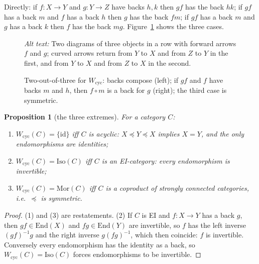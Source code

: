 \documentclass[11pt]{amsart}
\newtheorem{prop}[thm]{Proposition}
\theoremstyle{definition}
\newcommand{\Mor}{\mathrm{Mor}}
\newcommand{\Iso}{\mathrm{Iso}}
\newcommand{\End}{\mathrm{End}}
\newcommand{\Wcyc}{W_{\mathrm{cyc}}}
\begin{document}
Directly: if $f\colon X\to Y$ and $g\colon Y\to Z$ have backs $h,k$ then $gf$ has
the back $hk$; if $gf$ has a back $m$ and $f$ has a back $h$ then $g$ has the
back $fm$; if $gf$ has a back $m$ and $g$ has a back $k$ then $f$ has the
back $mg$. Figure~\ref{fig:cyc} shows the three cases.

\begin{figure}[ht]
\centering
{}
\qquad
{}
\caption{Two-out-of-three for $\Wcyc$: backs compose (left); if $gf$ and $f$
have backs $m$ and $h$, then $f\circ m$ is a back for $g$ (right); the third
case is symmetric.}
\label{fig:cyc}
\par\smallskip\noindent\textit{Alt text:} Two diagrams of three objects in a
row with forward arrows $f$ and $g$; curved arrows return from $Y$ to $X$ and
from $Z$ to $Y$ in the first, and from $Y$ to $X$ and from $Z$ to $X$ in the
second.
\end{figure}

\begin{prop}[the three extremes]\label{prop:extremes}
For a category $C$:
\begin{enumerate}
\item $\Wcyc(C)=\{\mathrm{id}\}$ iff $C$ is \emph{acyclic}: $X\preceq Y\preceq X$
implies $X=Y$, and the only endomorphisms are identities;
\item $\Wcyc(C)=\Iso(C)$ iff $C$ is an \emph{EI-category}: every endomorphism
is invertible;
\item $\Wcyc(C)=\Mor(C)$ iff $C$ is a coproduct of strongly connected
categories, i.e.\ $\preceq$ is symmetric.
\end{enumerate}
\end{prop}
\begin{proof}
(1) and (3) are restatements. (2) If $C$ is EI and $f\colon X\to Y$ has a back
$g$, then $gf\in\End(X)$ and $fg\in\End(Y)$ are invertible, so $f$ has the left
inverse $(gf)^{-1}g$ and the right inverse $g(fg)^{-1}$, which then coincide:
$f$ is invertible. Conversely every endomorphism has the identity as a back,
so $\Wcyc(C)=\Iso(C)$ forces endomorphisms to be invertible.
\end{proof}
\end{document}

